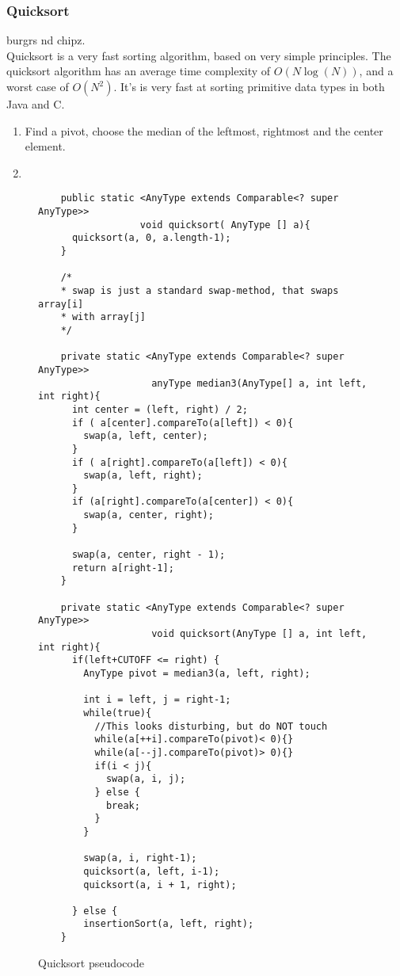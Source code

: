 \documentclass[paper=a4, fontsize=11pt]{scrartcl}
\numberwithin{equation}{section} %
\numberwithin{figure}{section} %
\numberwithin{table}{section} %
\theoremstyle{definition}
\begin{document}
\subsubsection{Quicksort}
burgrs nd chipz.\\
Quicksort is a very fast sorting algorithm, based on very simple principles. The quicksort algorithm has an average time complexity of \(O(N\log(N))\), and a worst case of \(O(N^2)\). It's is very fast at sorting primitive data types in both Java and C.

\begin{enumerate}
  \item Find a pivot, choose the median of the leftmost, rightmost and the center element.
  \item 
\end{enumerate}

\begin{figure}[p]
  \begin{verbatim}
    public static <AnyType extends Comparable<? super AnyType>> 
                  void quicksort( AnyType [] a){
      quicksort(a, 0, a.length-1);
    }
                  
    /*
    * swap is just a standard swap-method, that swaps array[i] 
    * with array[j]
    */

    private static <AnyType extends Comparable<? super AnyType>> 
                    anyType median3(AnyType[] a, int left, int right){
      int center = (left, right) / 2;
      if ( a[center].compareTo(a[left]) < 0){
        swap(a, left, center);
      }
      if ( a[right].compareTo(a[left]) < 0){
        swap(a, left, right);
      }
      if (a[right].compareTo(a[center]) < 0){
        swap(a, center, right);
      }

      swap(a, center, right - 1);
      return a[right-1];
    }

    private static <AnyType extends Comparable<? super AnyType>> 
                    void quicksort(AnyType [] a, int left, int right){
      if(left+CUTOFF <= right) {
        AnyType pivot = median3(a, left, right);
        
        int i = left, j = right-1;
        while(true){
          //This looks disturbing, but do NOT touch
          while(a[++i].compareTo(pivot)< 0){}
          while(a[--j].compareTo(pivot)> 0){}
          if(i < j){
            swap(a, i, j);
          } else {
            break;
          }
        }
        
        swap(a, i, right-1);
        quicksort(a, left, i-1);
        quicksort(a, i + 1, right);
        
      } else {
        insertionSort(a, left, right);
    }
  \end{verbatim}
  \caption{Quicksort pseudocode}
\end{figure}
\end{document}

